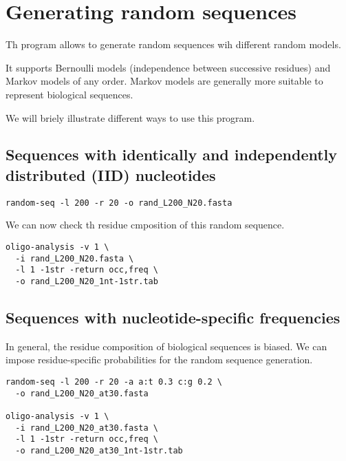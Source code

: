 \chapter{Generating random sequences}

Th program  allows to generate random sequences
wih different random models.

It supports Bernoulli models (independence between successive
residues) and Markov models of any order. Markov models are generally
more suitable to represent biological sequences. 


We will briely illustrate different ways to use this program. 

\section{Sequences with identically and independently distributed (IID) nucleotides}

\begin{small}
\begin{verbatim}
random-seq -l 200 -r 20 -o rand_L200_N20.fasta
\end{verbatim}
\end{small}

We can now check th residue cmposition of this random sequence.

\begin{small}
\begin{verbatim}
oligo-analysis -v 1 \
  -i rand_L200_N20.fasta \
  -l 1 -1str -return occ,freq \
  -o rand_L200_N20_1nt-1str.tab
\end{verbatim}
\end{small}

\section{Sequences with nucleotide-specific frequencies}

In general, the residue composition of biological sequences is
biased. We can impose residue-specific probabilities for the random
sequence generation.

\begin{small}
\begin{verbatim}
random-seq -l 200 -r 20 -a a:t 0.3 c:g 0.2 \
  -o rand_L200_N20_at30.fasta 

oligo-analysis -v 1 \
  -i rand_L200_N20_at30.fasta \
  -l 1 -1str -return occ,freq \
  -o rand_L200_N20_at30_1nt-1str.tab
\end{verbatim}
\end{small}


